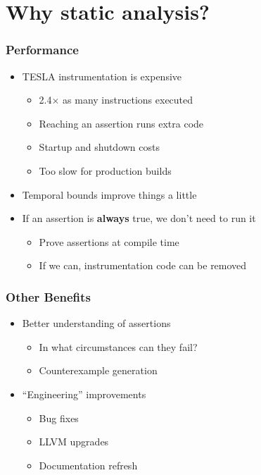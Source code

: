 \documentclass{beamer}
\begin{document}
\section{Why static analysis?}

\begin{frame}
  \frametitle{Performance}

  \begin{itemize}
    \item TESLA instrumentation is expensive
      \begin{itemize}
        \item 2.4$\times$ as many instructions executed
        \item Reaching an assertion runs extra code
        \item Startup and shutdown costs
        \item Too slow for production builds
      \end{itemize}

    \item Temporal bounds improve things a little

    \item If an assertion is \textbf{always} true, we don't need to run it
      \begin{itemize}
        \item Prove assertions at compile time
        \item If we can, instrumentation code can be removed
      \end{itemize}
  \end{itemize}
\end{frame}

\begin{frame}
  \frametitle{Other Benefits}

  \begin{itemize}
    \item Better understanding of assertions
      \begin{itemize}
        \item In what circumstances can they fail?
        \item Counterexample generation
      \end{itemize}

    \item ``Engineering'' improvements
      \begin{itemize}
        \item Bug fixes
        \item LLVM upgrades
        \item Documentation refresh
      \end{itemize}
  \end{itemize}
\end{frame}
\end{document}
